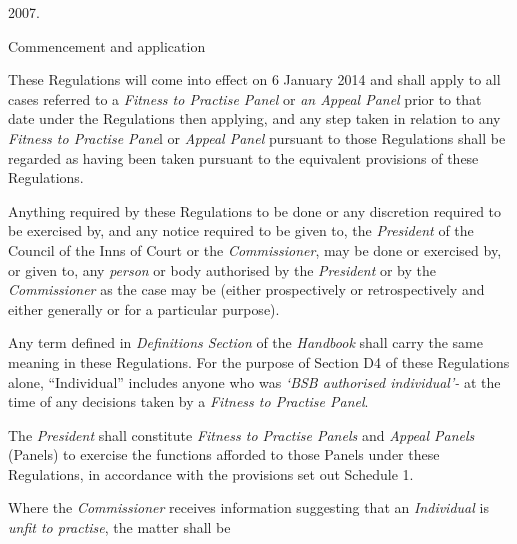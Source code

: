 2007.\\
\par
Commencement and application\\
\par
These Regulations will come into effect on 6 January 2014 and shall
apply to all cases referred to a \emph{Fitness to Practise
Panel} or \emph{an Appeal Panel} prior to that date under the
Regulations then applying, and any step taken in relation to
any \emph{Fitness to Practise Pane}l or \emph{Appeal Panel} pursuant to
those Regulations shall be regarded as having been taken pursuant to the
equivalent provisions of these Regulations.\\
\par
Anything required by these Regulations to be done or any discretion
required to be exercised by, and any notice required to be given to,
the \emph{President} of the Council of the Inns of Court or
the \emph{Commissioner}, may be done or exercised by, or given to,
any \emph{person} or body authorised by the \emph{President} or by
the \emph{Commissioner} as the case may be (either prospectively or
retrospectively and either generally or for a particular purpose).\\
\par
Any term defined in \emph{Definitions Section }of
the \emph{Handbook} shall carry the same meaning in these Regulations.
For the purpose of Section D4 of these Regulations alone, ``Individual''
includes anyone who was \emph{`BSB authorised individual'- }at the time
of any decisions taken by a \emph{Fitness to Practise Panel}.\\
\par
{}
The \emph{President} shall constitute \emph{Fitness to Practise
Panels} and \emph{Appeal Panels} (Panels) to exercise the functions
afforded to those Panels under these Regulations, in accordance with the
provisions set out Schedule 1.\\
\hspace*{0.333em}\par
{}\par
{}
Where the \emph{Commissioner} receives information suggesting that
an \emph{Individual} is \emph{unfit to practise}, the matter shall be

